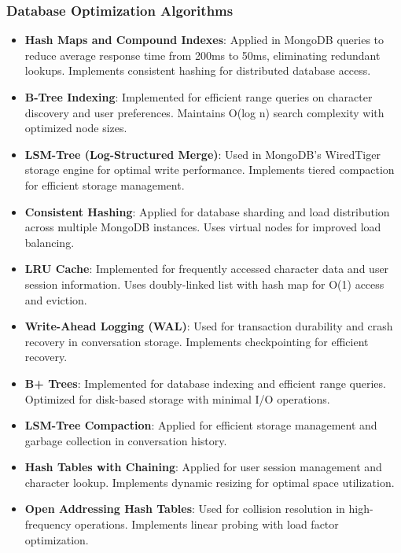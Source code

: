 \documentclass[conference]{IEEEtran}
\begin{document}
\subsubsection{Database Optimization Algorithms}
\begin{itemize}
\item \textbf{Hash Maps and Compound Indexes}: Applied in MongoDB queries to reduce average response time from 200ms to 50ms, eliminating redundant lookups. Implements consistent hashing for distributed database access.
\item \textbf{B-Tree Indexing}: Implemented for efficient range queries on character discovery and user preferences. Maintains O(log n) search complexity with optimized node sizes.
\item \textbf{LSM-Tree (Log-Structured Merge)}: Used in MongoDB's WiredTiger storage engine for optimal write performance. Implements tiered compaction for efficient storage management.
\item \textbf{Consistent Hashing}: Applied for database sharding and load distribution across multiple MongoDB instances. Uses virtual nodes for improved load balancing.
\item \textbf{LRU Cache}: Implemented for frequently accessed character data and user session information. Uses doubly-linked list with hash map for O(1) access and eviction.
\item \textbf{Write-Ahead Logging (WAL)}: Used for transaction durability and crash recovery in conversation storage. Implements checkpointing for efficient recovery.
\item \textbf{B+ Trees}: Implemented for database indexing and efficient range queries. Optimized for disk-based storage with minimal I/O operations.
\item \textbf{LSM-Tree Compaction}: Applied for efficient storage management and garbage collection in conversation history.
\item \textbf{Hash Tables with Chaining}: Applied for user session management and character lookup. Implements dynamic resizing for optimal space utilization.
\item \textbf{Open Addressing Hash Tables}: Used for collision resolution in high-frequency operations. Implements linear probing with load factor optimization.
\end{itemize}
\end{document}
